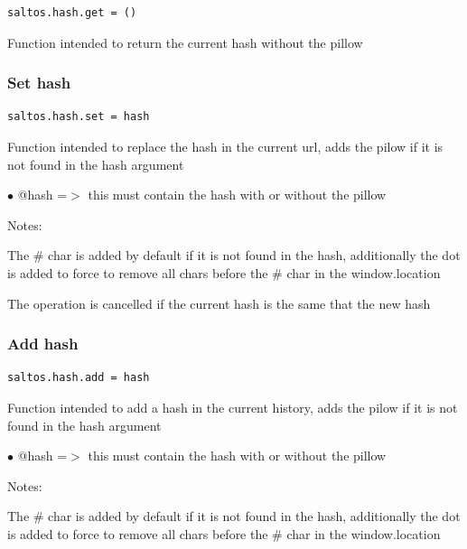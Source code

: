 \documentclass[a4paper]{article}
\begin{document}
\begin{lstlisting}
saltos.hash.get = ()
\end{lstlisting}

Function intended to return the current hash without the pillow

\hypertarget{toc252}{}
\subsubsection{Set hash}

\begin{lstlisting}
saltos.hash.set = hash
\end{lstlisting}

Function intended to replace the hash in the current url, adds the pilow if it is not found
in the hash argument

\begin{compactitem}
\item[\color{myblue}$\bullet$] @hash =$>$ this must contain the hash with or without the pillow
\end{compactitem}

Notes:

The \# char is added by default if it is not found in the hash, additionally the dot is
added to force to remove all chars before the \# char in the window.location

The operation is cancelled if the current hash is the same that the new hash

\hypertarget{toc253}{}
\subsubsection{Add hash}

\begin{lstlisting}
saltos.hash.add = hash
\end{lstlisting}

Function intended to add a hash in the current history, adds the pilow if it is not found
in the hash argument

\begin{compactitem}
\item[\color{myblue}$\bullet$] @hash =$>$ this must contain the hash with or without the pillow
\end{compactitem}

Notes:

The \# char is added by default if it is not found in the hash, additionally the dot is
added to force to remove all chars before the \# char in the window.location
\end{document}
